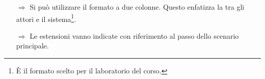 \begin{itemize}
    \item [$\Rightarrow$] Si può utilizzare il formato a due colonne. Questo enfatizza
    la  tra gli attori e il sistema\footnote{È il formato scelto per il laboratorio del corso.}.
    \begin{figure}[!h]
        \centering
    \end{figure}
    \item [$\Rightarrow$] Le estensioni vanno indicate con riferimento al passo dello scenario principale.
\begin{figure}[!h]
    \centering

\end{figure}
\end{itemize}
